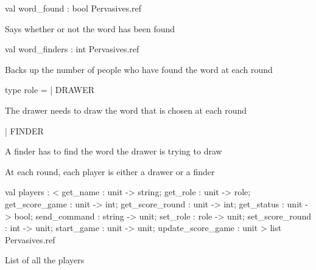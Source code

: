 \documentclass[11pt]{article}
\begin{document}
\label{val:Server.word-underscorefound}\begin{ocamldoccode}
val word_found : bool Pervasives.ref
\end{ocamldoccode}
\begin{ocamldocdescription}
Says whether or not the word has been found


\end{ocamldocdescription}




\label{val:Server.word-underscorefinders}\begin{ocamldoccode}
val word_finders : int Pervasives.ref
\end{ocamldoccode}
\begin{ocamldocdescription}
Backs up the number of people who have found the word at each round


\end{ocamldocdescription}




\label{type:Server.role}\begin{ocamldoccode}
type role =
  | DRAWER
\end{ocamldoccode}
\begin{ocamldoccomment}
The drawer needs to draw the word that is chosen at each round
\end{ocamldoccomment}
\begin{ocamldoccode}
  | FINDER
\end{ocamldoccode}
\begin{ocamldoccomment}
A finder has to find the word the drawer is trying to draw
\end{ocamldoccomment}
\begin{ocamldocdescription}
At each round, each player is either a drawer or a finder


\end{ocamldocdescription}




\label{val:Server.players}\begin{ocamldoccode}
val players :
  < get_name : unit -> string; get_role : unit -> role;
    get_score_game : unit -> int; get_score_round : unit -> int;
    get_status : unit -> bool; send_command : string -> unit;
    set_role : role -> unit; set_score_round : int -> unit;
    start_game : unit -> unit; update_score_game : unit >
  list Pervasives.ref
\end{ocamldoccode}
\begin{ocamldocdescription}
List of all the players


\end{ocamldocdescription}
\end{document}
